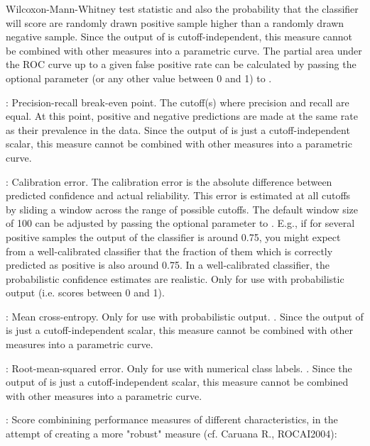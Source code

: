 \begin{Details}
{Wilcoxon-Mann-Whitney test statistic and also the probability that the
classifier will score are randomly drawn positive sample higher than a
randomly drawn negative sample. Since the output of
 is cutoff-independent, this
measure cannot be combined with other measures into a parametric
curve. The partial area under the ROC curve up to a given false
positive rate can be calculated by passing the optional parameter
 (or any other value between 0 and 1) to .
\item[\code{prbe}:] Precision-recall break-even point. The cutoff(s) where
precision and recall are equal. At this point, positive and negative
predictions are made at the same rate as their prevalence in the
data. Since the output of
 is just a cutoff-independent scalar, this
measure cannot be combined with other measures into a parametric curve.
\item[\code{cal}:] Calibration error. The calibration error is the
absolute difference between predicted confidence and actual reliability. This
error is estimated at all cutoffs by sliding a window across the
range of possible cutoffs. The default window size of 100 can be
adjusted by passing the optional parameter 
to . E.g., if for several
positive samples the output of the classifier is around 0.75, you might
expect from a well-calibrated classifier that the fraction of them
which is correctly predicted as positive is also around 0.75. In a
well-calibrated classifier, the probabilistic confidence estimates
are realistic. Only for use with
probabilistic output (i.e. scores between 0 and 1).
\item[\code{mxe}:] Mean cross-entropy. Only for use with
probabilistic output. . Since the output of
 is just a cutoff-independent scalar, this
measure cannot be combined with other measures into a parametric curve.
\item[\code{rmse}:] Root-mean-squared error. Only for use with
numerical class labels. . Since the output of
 is just a cutoff-independent scalar, this
measure cannot be combined with other measures into a parametric curve.
\item[\code{sar}:] Score combinining performance measures of different
characteristics, in the attempt of creating a more "robust"
measure (cf. Caruana R., ROCAI2004):
}
\end{Details}
